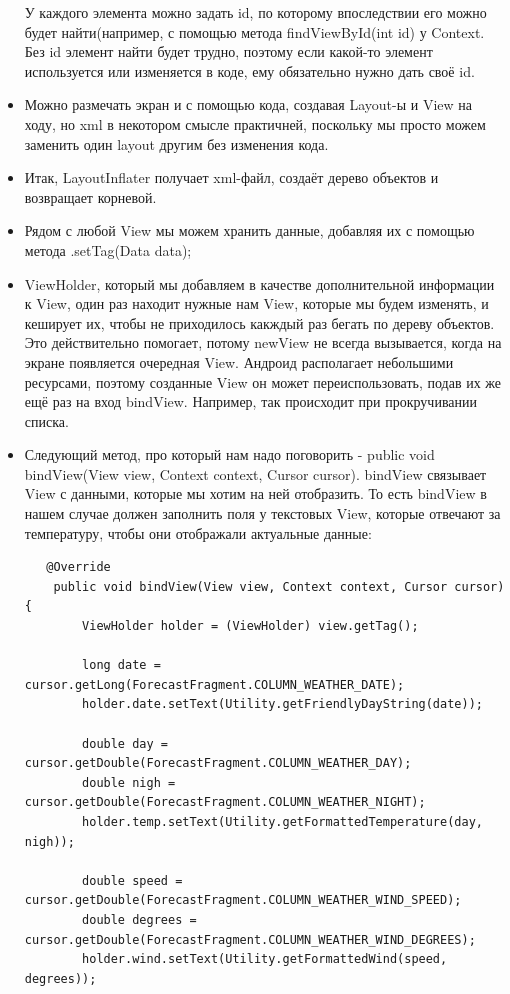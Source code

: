 \documentclass[12 pt]{article}
\begin{document}
\begin{itemize}
        У каждого элемента можно задать id, по которому впоследствии его можно будет найти(например, с помощью метода findViewById(int id) у Context. Без id элемент найти будет трудно, поэтому если какой-то элемент используется или изменяется в коде, ему обязательно нужно дать своё id.
        \item Можно размечать экран и с помощью кода, создавая Layout-ы и View на ходу, но xml в некотором смысле практичней, поскольку мы просто можем заменить один layout другим без изменения кода.
        \item Итак, LayoutInflater получает xml-файл, создаёт дерево объектов и возвращает корневой.
        \item Рядом с любой View мы можем хранить данные, добавляя их с помощью метода .setTag(Data data);
        \item ViewHolder, который мы добавляем в качестве дополнительной информации к View, один раз находит нужные нам View, которые мы будем изменять, и кеширует их, чтобы не приходилось какждый раз бегать по дереву объектов. Это действительно помогает, потому newView не всегда вызывается, когда на экране появляется очередная View. Андроид располагает небольшими ресурсами, поэтому созданные View он может переиспользовать, подав их же ещё раз на вход bindView. Например, так происходит при прокручивании списка.
        \item Следующий метод, про который нам надо поговорить - public void bindView(View view, Context context, Cursor cursor). bindView связывает View с данными, которые мы хотим на ней отобразить. То есть bindView в нашем случае должен заполнить поля у текстовых View, которые отвечают за температуру, чтобы они отображали актуальные данные:
 		\begin{lstlisting}
   @Override
    public void bindView(View view, Context context, Cursor cursor) {
        ViewHolder holder = (ViewHolder) view.getTag();

        long date = cursor.getLong(ForecastFragment.COLUMN_WEATHER_DATE);
        holder.date.setText(Utility.getFriendlyDayString(date));

        double day = cursor.getDouble(ForecastFragment.COLUMN_WEATHER_DAY);
        double nigh = cursor.getDouble(ForecastFragment.COLUMN_WEATHER_NIGHT);
        holder.temp.setText(Utility.getFormattedTemperature(day, nigh));

        double speed = cursor.getDouble(ForecastFragment.COLUMN_WEATHER_WIND_SPEED);
        double degrees = cursor.getDouble(ForecastFragment.COLUMN_WEATHER_WIND_DEGREES);
        holder.wind.setText(Utility.getFormattedWind(speed, degrees));


\end{lstlisting}
\end{itemize}
\end{document}
